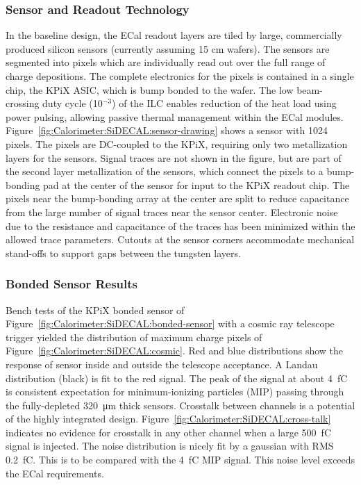 \subsubsection{Sensor and Readout Technology}
In the baseline design, the ECal readout layers are tiled by large, commercially produced silicon sensors (currently assuming 15 cm wafers). The sensors are segmented into pixels which are individually read out over the full range of charge depositions. The complete electronics for the pixels is contained in a single chip, the KPiX ASIC\cite{Brau:2013yb}, which is bump bonded to the wafer. The low beam-crossing duty cycle (10$^{-3}$) of the ILC enables reduction of the heat load using power pulsing, allowing passive thermal management within the ECal modules. Figure~\ref{fig:Calorimeter:SiDECAL:sensor-drawing} shows a sensor with 1024 pixels. 
The pixels are DC-coupled to the KPiX, requiring only two metallization layers for the sensors.
Signal traces are not shown in the figure, but are part of the second layer metallization of the sensors, which connect the pixels to a bump-bonding pad at the center of the sensor for input to the KPiX readout chip.  The pixels near the bump-bonding array at the center are split to reduce capacitance from the large number of signal traces near the sensor center. Electronic noise due to the resistance and capacitance of the traces has been minimized within the allowed trace parameters. Cutouts at the sensor corners accommodate mechanical stand-offs to support gaps between the tungsten layers.


\subsubsection{Bonded Sensor Results}
Bench tests of the KPiX bonded sensor of Figure~\ref{fig:Calorimeter:SiDECAL:bonded-sensor} with a cosmic ray telescope trigger yielded the distribution of maximum charge pixels of Figure~\ref{fig:Calorimeter:SiDECAL:cosmic}. Red and blue distributions show the response of sensor inside
and outside the telescope acceptance.
A Landau distribution (black) is fit to the red signal. The peak of the signal at about \SI{4}{fC} is consistent expectation for minimum-ionizing particles (MIP) passing through the fully-depleted \SI{320}{\micro\meter} thick sensors.
Crosstalk between channels is a potential of the highly integrated design.
Figure~\ref{fig:Calorimeter:SiDECAL:cross-talk} indicates no evidence for crosstalk in any other channel when a large \SI{500}{fC} signal is injected. The noise distribution is nicely fit by a gaussian with RMS \SI{0.2}{fC}. This is to be compared with the \SI{4}{fC} MIP signal. This noise level exceeds the ECal requirements.

